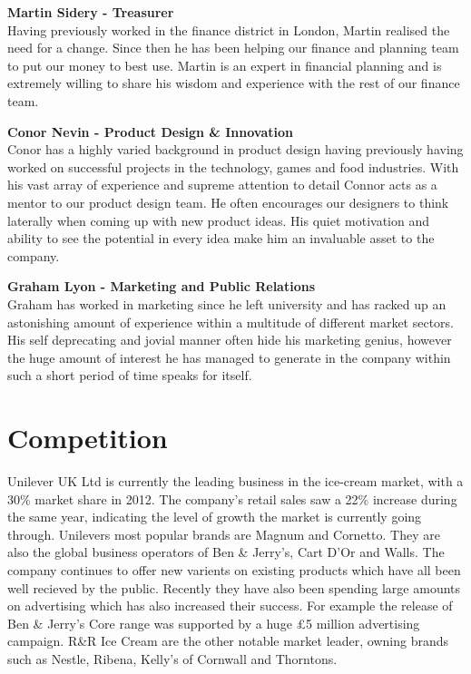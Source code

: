 \documentclass{article}
\begin{document}
  {\bf Martin Sidery - Treasurer} \\
  Having previously worked in the finance district in London, Martin realised the need for a change. Since then he has been helping our finance and planning team to put our money to best use. Martin is an expert in financial planning and is extremely willing to share his wisdom and experience with the rest of our finance team.
 
  {\bf Conor Nevin - Product Design \& Innovation} \\
  Conor has a highly varied background in product design having previously having worked on successful projects in the technology, games and food industries. With his vast array of experience and supreme attention to detail Connor acts as a mentor to our product design team. He often encourages our designers to think laterally when coming up with new product ideas. His quiet motivation and ability to see the potential in every idea make him an invaluable asset to the company.

  {\bf Graham Lyon - Marketing and Public Relations} \\
  Graham has worked in marketing since he left university and has racked up an astonishing amount of experience within a multitude of different market sectors. His self deprecating and jovial manner often hide his marketing genius, however the huge amount of interest he has managed to generate in the company within such a short period of time speaks for itself.


\section{Competition}

  Unilever UK Ltd is currently the leading business in the ice-cream market, with a 30\% market share in 2012. The company's retail sales saw a 22\% increase during the same year, indicating the level of growth the market is currently going through. Unilevers most popular brands are Magnum and Cornetto. They are also the global business operators of Ben \& Jerry's, Cart D'Or and Walls. The company continues to offer new varients on existing products which have all been well recieved by the public. Recently they have also been spending large amounts on advertising which has also increased their success. For example the release of Ben \& Jerry's Core range was supported by a huge £5 million advertising campaign. R\&R Ice Cream are the other notable market leader, owning brands such as Nestle, Ribena, Kelly's of Cornwall and Thorntons. \\
\end{document}
